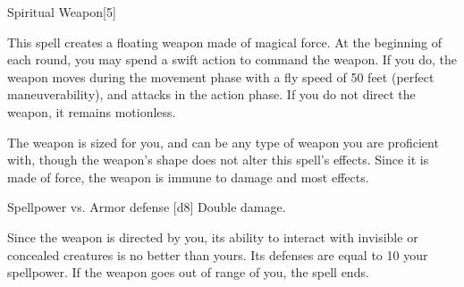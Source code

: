 \begin{spellsection}{Spiritual Weapon}[5]
    \begin{spellheader}
    \end{spellheader}
    \begin{spellcontent}
        \begin{spelltargetinginfo}
        \end{spelltargetinginfo}
        \begin{spelleffects}
            \spelleffect This spell creates a floating weapon made of magical force. At the beginning of each round, you may spend a swift action to command the weapon. If you do, the weapon moves during the movement phase with a fly speed of 50 feet (perfect maneuverability), and attacks in the action phase. If you do not direct the weapon, it remains motionless.

            The weapon is sized for you, and can be any type of weapon you are proficient with, though the weapon's shape does not alter this spell's effects. Since it is made of force, the weapon is immune to damage and most effects.
            \spelldur \durlong \dismissable
        \end{spelleffects}
    \end{spellcontent}
    \begin{spellsubcontent}
        \begin{spelltargetinginfo}
        \end{spelltargetinginfo}
        \begin{spelleffects}
            \begin{spellattack}{Spellpower vs. Armor defense}
                \spellsuccess {}[d8]
                \spellcritical Double damage.
            \end{spellattack}
        \end{spelleffects}
    \end{spellsubcontent}
    \begin{spellfooter}
        \spellnotes Since the weapon is directed by you, its ability to interact with invisible or concealed creatures is no better than yours. Its defenses are equal to 10 \add your spellpower. If the weapon goes out of range of you, the spell ends.
        \miscastexplode
    \end{spellfooter}
\end{spellsection}

